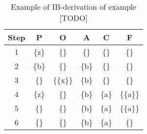 
%

\begin{table}[h]
  \begin{center}
    \begin{tabular}{cccccc}
    \hline
    Step & P     & O         & A     & C     & F         \\ \hline
    1    & \{z\} & \{\}      & \{\}  & \{\}  & \{\}      \\
    2    & \{b\} & \{\}      & \{b\} & \{\}  & \{\}      \\
    3    & \{\}  & \{\{x\}\} & \{b\} & \{\}  & \{\}      \\
    4    & \{z\} & \{\}      & \{b\} & \{a\} & \{\{a\}\} \\
    5    & \{\}  & \{\}      & \{b\} & \{a\} & \{\{a\}\} \\
    6    & \{\}  & \{\}      & \{b\} & \{a\} & \{\}      \\ \hline
    \end{tabular}
    \caption {Example of IB-derivation of example [TODO]}
  \end{center}
\end{table}

%


